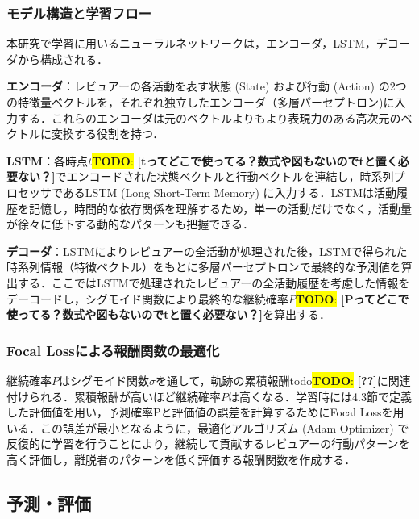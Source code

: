 \documentclass[submit,techrep,noauthor]{ipsj}
\newcommand{\todo}[1]{\colorbox{yellow}{{\bf TODO}:}{\color{red} {\textbf{[#1]}}}}
\begin{document}
\subsubsection{モデル構造と学習フロー}
本研究で学習に用いるニューラルネットワークは，エンコーダ，LSTM，デコーダから構成される．

\noindent\textbf{エンコーダ}：レビュアーの各活動を表す状態 (State) および行動 (Action) の2つの特徴量ベクトルを，それぞれ独立したエンコーダ（多層パーセプトロン)に入力する．これらのエンコーダは元のベクトルよりもより表現力のある高次元のベクトルに変換する役割を持つ．

\noindent\textbf{LSTM}：各時点$t$\todo{tってどこで使ってる？数式や図もないのでtと置く必要ない？}でエンコードされた状態ベクトルと行動ベクトルを連結し，時系列プロセッサであるLSTM (Long Short-Term Memory) に入力する．LSTMは活動履歴を記憶し，時間的な依存関係を理解するため，単一の活動だけでなく，活動量が徐々に低下する動的なパターンも把握できる．

\noindent\textbf{デコーダ}：LSTMによりレビュアーの全活動が処理された後，LSTMで得られた時系列情報（特徴ベクトル）をもとに多層パーセプトロンで最終的な予測値を算出する．ここではLSTMで処理されたレビュアーの全活動履歴を考慮した情報をデーコードし，シグモイド関数により最終的な継続確率$P$\todo{Pってどこで使ってる？数式や図もないのでtと置く必要ない？}を算出する．



\subsubsection{Focal Lossによる報酬関数の最適化}

継続確率$P$はシグモイド関数$\sigma$を通して，軌跡の累積報酬todo\todo{??}に関連付けられる．累積報酬が高いほど継続確率$P$は高くなる．学習時には4.3節で定義した評価値を用い，予測確率Pと評価値の誤差を計算するためにFocal Lossを用いる．この誤差が最小となるように，最適化アルゴリズム (Adam Optimizer) で反復的に学習を行うことにより，継続して貢献するレビュアーの行動パターンを高く評価し，離脱者のパターンを低く評価する報酬関数を作成する．


\subsection{予測・評価}
\end{document}
